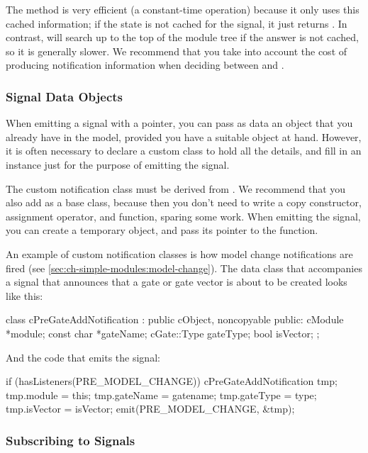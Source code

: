 The  method is very efficient (a constant-time
operation) because it only uses this cached information; if the state is
not cached for the signal, it just returns . In contrast,
 will search up to the top of the module tree if
the answer is not cached, so it is generally slower. We recommend that
you take into account the cost of producing notification information when
deciding between  and .


\subsubsection{Signal Data Objects}

When emitting a signal with a  pointer, you can pass as data
an object that you already have in the model, provided you have a suitable
object at hand. However, it is often necessary to declare a custom class
to hold all the details, and fill in an instance just for the purpose of
emitting the signal.

The custom notification class must be derived from .
We recommend that you also add  as a base class, because
then you don't need to write a copy constructor, assignment operator, and
 function, sparing some work. When emitting the signal, you
can create a temporary object, and pass its pointer to the 
function.

An example of custom notification classes is how model change notifications
are fired (see \ref{sec:ch-simple-modules:model-change}). The data class
that accompanies a signal that announces that a gate or gate vector is
about to be created looks like this:

\begin{cpp}
class cPreGateAddNotification : public cObject, noncopyable
{
  public:
    cModule *module;
    const char *gateName;
    cGate::Type gateType;
    bool isVector;
};
\end{cpp}

And the code that emits the signal:

\begin{cpp}
if (hasListeners(PRE_MODEL_CHANGE))
{
    cPreGateAddNotification tmp;
    tmp.module = this;
    tmp.gateName = gatename;
    tmp.gateType = type;
    tmp.isVector = isVector;
    emit(PRE_MODEL_CHANGE, &tmp);
}
\end{cpp}


\subsubsection{Subscribing to Signals}


